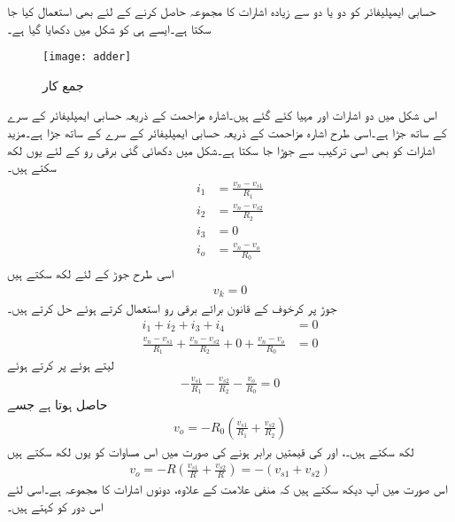 
حسابی ایمپلیفائر کو دو یا دو سے زیادہ اشارات کا مجموعہ حاصل کرنے کے لئے بھی استعمال کیا جا سکتا ہے۔ایسے ہی   کو شکل  میں دکھایا گیا ہے۔
\begin{figure}
\centering
\texttt{[image: adder]}
\caption{جمع کار}
\label{شکل_جمع_کار}
\end{figure}
	اس شکل میں دو اشارات  اور  مہیا کئے گئے ہیں۔اشارہ  مزاحمت  کے ذریعہ حسابی ایمپلیفائر کے  سرے کے ساتھ جڑا ہے۔اسی طرح اشارہ  مزاحمت  کے ذریعہ حسابی ایمپلیفائر کے  سرے کے ساتھ جڑا ہے۔مزید اشارات کو بھی اسی ترکیب سے جوڑا جا سکتا ہے۔شکل میں دکھائی گئی برقی رو کے لئے یوں لکھ سکتے ہیں۔
\begin{gather}
\begin{aligned}
i_1 &=\frac{v_n-v_{s1}}{R_1} \\
i_2 &=\frac{v_n-v_{s2}}{R_2} \\
i_3&=0 \\
i_o &=\frac{v_n-v_o}{R_0}
\end{aligned}
\end{gather}
اسی طرح جوڑ  کے لئے لکھ سکتے ہیں
\begin{align}
v_k =0
\end{align}
جوڑ  پر کرخوف کے قانون برائے برقی رو استعمال کرتے ہوئے حل کرتے ہیں۔
\begin{align*}
i_1+i_2+i_3+i_4&=0 \\
\frac{v_n-v_{s1}}{R_1}+\frac{v_n-v_{s2}}{R_2}+0+\frac{v_n-v_o}{R_0}&=0
\end{align*}
 لیتے ہوئے  پر کرتے ہوئے
\begin{align*}
-\frac{v_{s1}}{R_1}-\frac{v_{s2}}{R_2}-\frac{v_o}{R_0}=0
\end{align*}
حاصل ہوتا ہے جسے
\begin{align}
v_o= -R_0 \left (\frac{v_{s1}}{R_1}+\frac{v_{s2}}{R_2}  \right)
\end{align}
لکھ سکتے ہیں۔، اور  کی قیمتیں برابر ہونے کی صورت میں اس مساوات کو یوں لکھ سکتے ہیں
\begin{align}
v_o = -R \left (\frac{v_{s1}}{R} +\frac{v_{s2}}{R}\right)=- \left (v_{s1}+v_{s2} \right )
\end{align}
اس صورت میں آپ دیکھ سکتے ہیں کہ منفی علامت کے علاوہ،   دونوں اشارات کا مجموعہ ہے۔اسی لئے اس دور کو   کہتے ہیں۔


